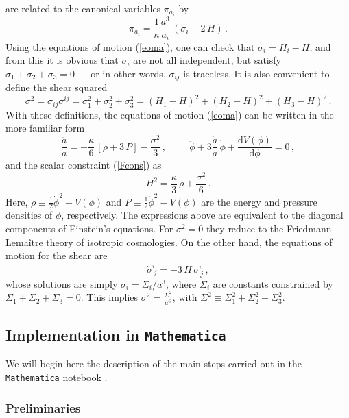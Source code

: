 \documentclass[11pt,tightenlines,eqsecnum,floats,aps,amsmath,amssymb,nofootinbib,prd,floatfix]{revtex4}
\def\f{\frac}
\def\d{\textrm{d}}
\newcommand{\be}{\nopagebreak[3]\begin{equation}}
\newcommand{\ee}{\end{equation}}
\newcommand{\<}{\langle}
\renewcommand{\>}{\rangle}
\begin{document}
%
are related to the canonical variables $\pi_{a_i}$ by 
%
\be \pi_{a_i}=\frac{1}{\kappa}\frac{a^3}{a_i}\, (\sigma_i-2\, H)\, . \ee
Using the equations of motion (\ref{eoma}), one can check that $\sigma_i=H_i-H$, and from this it is obvious that  $\sigma_i$ are not all independent, but   satisfy  $\sigma_1+\sigma_2+\sigma_3=0$ --- or in other words, $ \sigma_{ij}$ is traceless.
%
 It is also convenient to define the shear squared 
\be\sigma^2=\sigma_{ij}\sigma^{ij}=\sigma_1^2+\sigma_2^2+\sigma_3^2=(H_1-H)^2+(H_2-H)^2+(H_3-H)^2\, .
\ee
%
With these  definitions, the equations of motion (\ref{eoma}) can be written in the  more familiar form
\be \label{aver} \frac{\ddot a}{a}=-\frac{\kappa}{6}\, [\rho+3\, P]-\frac{\sigma^2}{3} \, , \hspace{1cm} \ddot \phi+3\f{\dot a}{a}\, \dot\phi+\frac{\d V(\phi)}{\d\phi}=0 \, , \ee
and the scalar constraint (\ref{Fcons}) as
%
\be  \label{cons} H^2=\frac{\kappa}{3}\, \rho +\frac{\sigma^2}{6}\, . \ee
%
Here, $\rho\equiv \f{1}{2}\dot \phi^2+V(\phi)$ and $P\equiv \f{1}{2}\dot \phi^2-V(\phi)$ are the energy and pressure densities of $\phi$, respectively.  The expressions above are equivalent to the diagonal components of Einstein's equations. For $\sigma^2=0$ they reduce to the Friedmann-Lema\^itre theory of  isotropic cosmologies. On the other hand, the equations of motion for the shear are
%
\be \label{eqanis} \dot \sigma^i_{\  j}=-3\, H\, \sigma^i_{\ j} \, , \ee
%
whose solutions are simply 
$\sigma_i=\Sigma_i/a^3$, where $\Sigma_i$ are constants constrained by $\Sigma_1+\Sigma_2+\Sigma_3=0$. This implies $\sigma^2=\frac{\Sigma^2}{a^6}$, with $\Sigma^2\equiv \Sigma_1^2+\Sigma_2^2+\Sigma_3^2$.


\subsection{Implementation in {\tt Mathematica}}

We will begin here the description of the  main steps carried out in the {\tt Mathematica} notebook \cite{ntbk}.

\subsubsection{Preliminaries}
\end{document}
